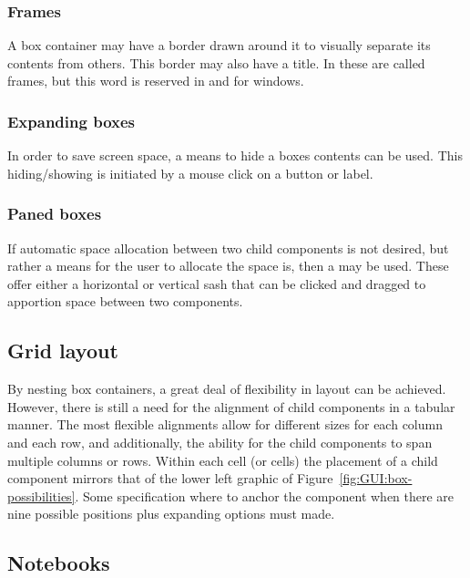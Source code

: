 \subsubsection{Frames}
\label{sec:GUI:frames}

A box container may have a border drawn around it to visually separate
its contents from others. This border may also have a title. In
\GTK\/ these are called frames, but this word is reserved in
\Java\/ and \wxWidgets\/ for windows.

\subsubsection{Expanding boxes}
\label{sec:GUI:expanding-boxes}

In order to save screen space, a means to hide a boxes contents can be
used. This hiding/showing is initiated by a mouse click on a button or
label. 

\subsubsection{Paned boxes}
\label{sec:GUI:paned-boxes}

If automatic space allocation between two child components is not
desired, but rather a means for the user to allocate the space is,
then a  may be used. These offer either a
horizontal or vertical sash that can be clicked and dragged to
apportion space between two components.

   
\subsection{Grid layout}
\label{sec:GUI:grid-layout}

By nesting box containers, a great deal of flexibility in layout can
be achieved. However, there is still a need for the alignment of child
components in a tabular manner. The most flexible alignments allow for
different sizes for each column and each row, and additionally, the
ability for the child components to span multiple columns or
rows. Within each cell (or cells) the placement of a child component
mirrors that of the lower left graphic of
Figure~\ref{fig:GUI:box-possibilities}. Some specification where to
anchor the component when there are nine possible positions plus
expanding options must made.

\subsection{Notebooks}
\label{sec:GUI:notebooks}

